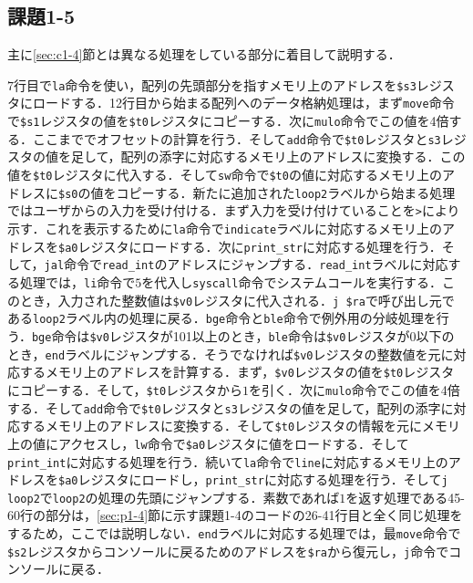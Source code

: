 \subsection{課題1-5}
主に\ref{sec:c1-4}節とは異なる処理をしている部分に着目して説明する．

$7$行目で\verb|la|命令を使い，配列の先頭部分を指すメモリ上のアドレスを\verb|$s3|レジスタにロードする．12行目から始まる配列へのデータ格納処理は，まず\verb|move|命令で\verb|$s1|レジスタの値を\verb|$t0|レジスタにコピーする．次に\verb|mulo|命令でこの値を4倍する．ここまででオフセットの計算を行う．そして\verb|add|命令で\verb|$t0|レジスタと\verb|s3|レジスタの値を足して，配列の添字に対応するメモリ上のアドレスに変換する．この値を\verb|$t0|レジスタに代入する．そして\verb|sw|命令で\verb|$t0|の値に対応するメモリ上のアドレスに\verb|$s0|の値をコピーする．新たに追加された\verb|loop2|ラベルから始まる処理ではユーザからの入力を受け付ける．まず入力を受け付けていることを\verb|>|により示す．これを表示するために\verb|la|命令で\verb|indicate|ラベルに対応するメモリ上のアドレスを\verb|$a0|レジスタにロードする．次に\verb|print_str|に対応する処理を行う．そして，\verb|jal|命令で\verb|read_int|のアドレスにジャンプする．\verb|read_int|ラベルに対応する処理では，\verb|li|命令で$5$を代入し\verb|syscall|命令でシステムコールを実行する．このとき，入力された整数値は\verb|$v0|レジスタに代入される．\verb|j $ra|で呼び出し元である\verb|loop2|ラベル内の処理に戻る．\verb|bge|命令と\verb|ble|命令で例外用の分岐処理を行う．\verb|bge|命令は\verb|$v0|レジスタが101以上のとき，\verb|ble|命令は\verb|$v0|レジスタが0以下のとき，\verb|end|ラベルにジャンプする．そうでなければ\verb|$v0|レジスタの整数値を元に対応するメモリ上のアドレスを計算する．まず，\verb|$v0|レジスタの値を\verb|$t0|レジスタにコピーする．そして，\verb|$t0|レジスタから$1$を引く．次に\verb|mulo|命令でこの値を4倍する．そして\verb|add|命令で\verb|$t0|レジスタと\verb|s3|レジスタの値を足して，配列の添字に対応するメモリ上のアドレスに変換する．そして\verb|$t0|レジスタの情報を元にメモリ上の値にアクセスし，\verb|lw|命令で\verb|$a0|レジスタに値をロードする．そして\verb|print_int|に対応する処理を行う．続いて\verb|la|命令で\verb|line|に対応するメモリ上のアドレスを\verb|$a0|レジスタにロードし，\verb|print_str|に対応する処理を行う．そして\verb|j loop2|で\verb|loop2|の処理の先頭にジャンプする．素数であれば$1$を返す処理である45-60行の部分は，\ref{sec:p1-4}節に示す課題1-4のコードの26-41行目と全く同じ処理をするため，ここでは説明しない．\verb|end|ラベルに対応する処理では，最\verb|move|命令で\verb|$s2|レジスタからコンソールに戻るためのアドレスを\verb|$ra|から復元し，\verb|j|命令でコンソールに戻る．


